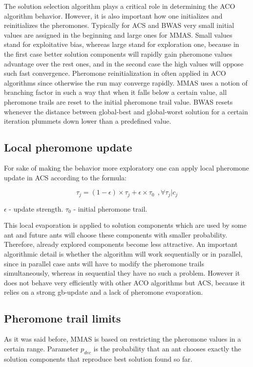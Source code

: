 The solution selection algorithm plays a critical role in determining the ACO algorithm behavior. However, it is also important how one initializes and reinitializes the pheromones. Typically for ACS and BWAS very small initial values are assigned in the beginning and large ones for MMAS. Small values stand for exploitative bias, whereas large stand for exploration one, because in the first case better solution components will rapidly gain pheromone values advantage over the rest ones, and in the second case the high values will oppose such fast convergence. Pheromone reinitialization in often applied in ACO algorithms since otherwise the run may converge rapidly. MMAS uses a notion of branching factor in such a way that when it falls below a certain value, all pheromone trails are reset to the initial pheromone trail value. BWAS resets whenever the distance between global-best and global-worst solution for a certain iteration plummets down lower than a predefined value.


\subsection{Local pheromone update}
For sake of making the behavior more exploratory one can apply \cite{coop_tsp} local pheromone update in ACS according to the formula:

\begin{equation}
\tau_j = (1 - \epsilon) \times \tau_j + \epsilon \times \tau_0 \ \ ,\forall \tau_j | c_j
\label{eq:local_update}
\end{equation}

$\epsilon$ - update strength. $\tau_0$ - initial pheromone trail.

This local evaporation is applied to solution components which are used by some ant and future ants will choose these components with smaller probability. Therefore, already explored components become less attractive. An important algorithmic detail is whether the algorithm will work sequentially or in parallel, since in parallel case ants will have to modify the pheromone trails simultaneously, whereas in sequential they have no such a problem. However it does not behave very efficiently with other ACO algorithms but ACS, because it relies on a strong gb-update and a lack of pheromone evaporation.

\subsection{Pheromone trail limits}
As it was said before, MMAS is based on restricting the pheromone values in a certain range. Parameter $p_{dec}$ is the probability that an ant chooses exactly the solution components that reproduce best solution found so far.

